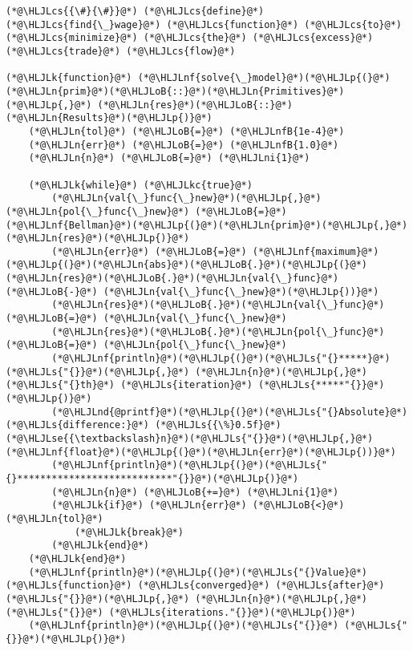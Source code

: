 \documentclass[12pt,a4paper]{article}
\newcommand{\HLJLk}[1]{\textcolor[RGB]{148,91,176}{\textbf{#1}}}
\newcommand{\HLJLkc}[1]{\textcolor[RGB]{59,151,46}{\textit{#1}}}
\newcommand{\HLJLn}[1]{#1}
\newcommand{\HLJLnd}[1]{\textcolor[RGB]{214,102,97}{#1}}
\newcommand{\HLJLnf}[1]{\textcolor[RGB]{66,102,213}{#1}}
\newcommand{\HLJLs}[1]{\textcolor[RGB]{201,61,57}{#1}}
\newcommand{\HLJLse}[1]{\textcolor[RGB]{59,151,46}{#1}}
\newcommand{\HLJLnfB}[1]{\textcolor[RGB]{59,151,46}{#1}}
\newcommand{\HLJLni}[1]{\textcolor[RGB]{59,151,46}{#1}}
\newcommand{\HLJLoB}[1]{\textcolor[RGB]{102,102,102}{\textbf{#1}}}
\newcommand{\HLJLp}[1]{#1}
\newcommand{\HLJLcs}[1]{\textcolor[RGB]{153,153,119}{\textit{#1}}}
\begin{document}
\begin{lstlisting}
(*@\HLJLcs{{\#}{\#}}@*) (*@\HLJLcs{define}@*) (*@\HLJLcs{find{\_}wage}@*) (*@\HLJLcs{function}@*) (*@\HLJLcs{to}@*) (*@\HLJLcs{minimize}@*) (*@\HLJLcs{the}@*) (*@\HLJLcs{excess}@*) (*@\HLJLcs{trade}@*) (*@\HLJLcs{flow}@*)

(*@\HLJLk{function}@*) (*@\HLJLnf{solve{\_}model}@*)(*@\HLJLp{(}@*)(*@\HLJLn{prim}@*)(*@\HLJLoB{::}@*)(*@\HLJLn{Primitives}@*)(*@\HLJLp{,}@*) (*@\HLJLn{res}@*)(*@\HLJLoB{::}@*)(*@\HLJLn{Results}@*)(*@\HLJLp{)}@*)
    (*@\HLJLn{tol}@*) (*@\HLJLoB{=}@*) (*@\HLJLnfB{1e-4}@*)
    (*@\HLJLn{err}@*) (*@\HLJLoB{=}@*) (*@\HLJLnfB{1.0}@*)
    (*@\HLJLn{n}@*) (*@\HLJLoB{=}@*) (*@\HLJLni{1}@*)

    (*@\HLJLk{while}@*) (*@\HLJLkc{true}@*)
        (*@\HLJLn{val{\_}func{\_}new}@*)(*@\HLJLp{,}@*) (*@\HLJLn{pol{\_}func{\_}new}@*) (*@\HLJLoB{=}@*) (*@\HLJLnf{Bellman}@*)(*@\HLJLp{(}@*)(*@\HLJLn{prim}@*)(*@\HLJLp{,}@*) (*@\HLJLn{res}@*)(*@\HLJLp{)}@*)
        (*@\HLJLn{err}@*) (*@\HLJLoB{=}@*) (*@\HLJLnf{maximum}@*)(*@\HLJLp{(}@*)(*@\HLJLn{abs}@*)(*@\HLJLoB{.}@*)(*@\HLJLp{(}@*)(*@\HLJLn{res}@*)(*@\HLJLoB{.}@*)(*@\HLJLn{val{\_}func}@*) (*@\HLJLoB{-}@*) (*@\HLJLn{val{\_}func{\_}new}@*)(*@\HLJLp{))}@*)
        (*@\HLJLn{res}@*)(*@\HLJLoB{.}@*)(*@\HLJLn{val{\_}func}@*) (*@\HLJLoB{=}@*) (*@\HLJLn{val{\_}func{\_}new}@*)
        (*@\HLJLn{res}@*)(*@\HLJLoB{.}@*)(*@\HLJLn{pol{\_}func}@*) (*@\HLJLoB{=}@*) (*@\HLJLn{pol{\_}func{\_}new}@*)
        (*@\HLJLnf{println}@*)(*@\HLJLp{(}@*)(*@\HLJLs{"{}*****}@*) (*@\HLJLs{"{}}@*)(*@\HLJLp{,}@*) (*@\HLJLn{n}@*)(*@\HLJLp{,}@*) (*@\HLJLs{"{}th}@*) (*@\HLJLs{iteration}@*) (*@\HLJLs{*****"{}}@*)(*@\HLJLp{)}@*)
        (*@\HLJLnd{@printf}@*)(*@\HLJLp{(}@*)(*@\HLJLs{"{}Absolute}@*) (*@\HLJLs{difference:}@*) (*@\HLJLs{{\%}0.5f}@*) (*@\HLJLse{{\textbackslash}n}@*)(*@\HLJLs{"{}}@*)(*@\HLJLp{,}@*) (*@\HLJLnf{float}@*)(*@\HLJLp{(}@*)(*@\HLJLn{err}@*)(*@\HLJLp{))}@*)
        (*@\HLJLnf{println}@*)(*@\HLJLp{(}@*)(*@\HLJLs{"{}***************************"{}}@*)(*@\HLJLp{)}@*)
        (*@\HLJLn{n}@*) (*@\HLJLoB{+=}@*) (*@\HLJLni{1}@*)
        (*@\HLJLk{if}@*) (*@\HLJLn{err}@*) (*@\HLJLoB{<}@*) (*@\HLJLn{tol}@*)
            (*@\HLJLk{break}@*)
        (*@\HLJLk{end}@*)
    (*@\HLJLk{end}@*)
    (*@\HLJLnf{println}@*)(*@\HLJLp{(}@*)(*@\HLJLs{"{}Value}@*) (*@\HLJLs{function}@*) (*@\HLJLs{converged}@*) (*@\HLJLs{after}@*) (*@\HLJLs{"{}}@*)(*@\HLJLp{,}@*) (*@\HLJLn{n}@*)(*@\HLJLp{,}@*) (*@\HLJLs{"{}}@*) (*@\HLJLs{iterations."{}}@*)(*@\HLJLp{)}@*)
    (*@\HLJLnf{println}@*)(*@\HLJLp{(}@*)(*@\HLJLs{"{}}@*) (*@\HLJLs{"{}}@*)(*@\HLJLp{)}@*)


\end{lstlisting}
\end{document}
